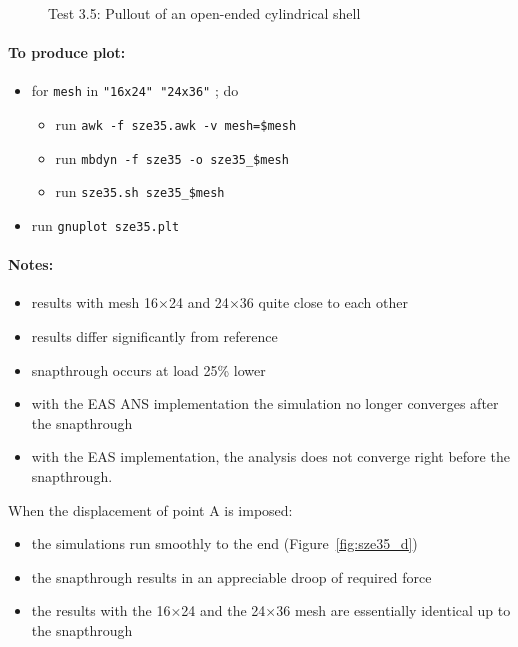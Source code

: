 \documentclass{article}
\newcommand{\mesh}[2]{#1$\times$#2}
\begin{document}
\begin{figure}[h]
\centering
{}
\psfrag{16x24}{\footnotesize \mesh{16}{24}}
\psfrag{24x36}{\footnotesize \mesh{24}{36}}
\hfill%
\caption{Test 3.5: Pullout of an open-ended cylindrical shell}
\end{figure}

\paragraph{To produce plot:}
\begin{itemize}
\item for \verb!mesh! in \verb!"16x24" "24x36"! ; do
	\begin{itemize}
	\item run \verb!awk -f sze35.awk -v mesh=$mesh!
	\item run \verb!mbdyn -f sze35 -o sze35_$mesh!
	\item run \verb!sze35.sh sze35_$mesh!
	\end{itemize}
\item run \verb!gnuplot sze35.plt!
\end{itemize}

\paragraph{Notes:}
\begin{itemize}
\item results with mesh \mesh{16}{24} and \mesh{24}{36} quite close to each other
\item results differ significantly from reference
\item snapthrough occurs at load 25\% lower
\item with the EAS ANS implementation the simulation no longer converges after the snapthrough
\item with the EAS implementation, the analysis does not converge right before the snapthrough.
\end{itemize}
When the displacement of point A is imposed:
\begin{itemize}
\item the simulations run smoothly to the end (Figure~\ref{fig:sze35_d})
\item the snapthrough results in an appreciable droop of required force
\item the results with the \mesh{16}{24} and the \mesh{24}{36} mesh
are essentially identical up to the snapthrough
\end{itemize}
\end{document}
